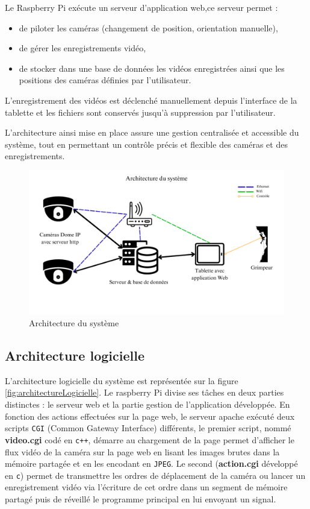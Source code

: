 \documentclass[a4paper, 11pt, french]{article}
\begin{document}
Le Raspberry Pi exécute un serveur d’application web,ce serveur permet :
\begin{itemize}
    \item de piloter les caméras (changement de position, orientation manuelle),
    \item de gérer les enregistrements vidéo,
    \item de stocker dans une base de données les vidéos enregistrées ainsi que les positions des caméras définies par l’utilisateur.
\end{itemize}

L’enregistrement des vidéos est déclenché manuellement depuis l’interface de la tablette et les fichiers sont conservés jusqu’à suppression par l’utilisateur.

L’architecture ainsi mise en place assure une gestion centralisée et accessible du système, tout en permettant un contrôle précis et flexible des caméras et des enregistrements.


\begin{figure}[!ht]
  \centering
  \includegraphics[width=\textwidth]{architectureMaterielle.png}
  \caption{Architecture du système}
  \label{fig:architecture}
\end{figure}

\subsection{Architecture logicielle}
L'architecture logicielle du système est représentée sur la figure \ref{fig:architectureLogicielle}. Le raspberry Pi divise ses tâches en deux parties distinctes : le serveur web et la partie gestion de l'application développée. En fonction des actions effectuées sur la page web, le serveur apache exécuté deux scripts \texttt{CGI} (Common Gateway Interface) différents, le premier script, nommé \textbf{video.cgi} codé en \texttt{c++}, démarre au chargement de la page permet d'afficher le flux vidéo de la caméra sur la page web en lisant les images brutes dans la mémoire partagée et en les encodant en \texttt{JPEG}. Le second (\textbf{action.cgi} développé en \texttt{c}) permet de transmettre les ordres de déplacement de la caméra ou lancer un enregistrement vidéo via l'écriture de cet ordre dans un segment de mémoire partagé puis de réveillé le programme principal en lui envoyant un signal. 
\end{document}
